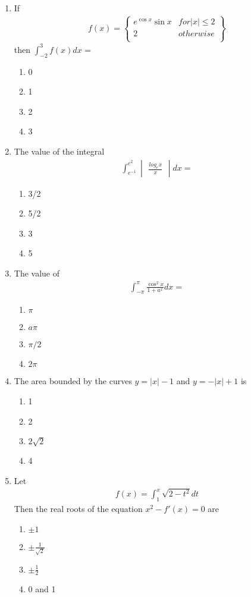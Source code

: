 \begin{enumerate}[label=\arabic*.,ref=\thesubsection.\theenumi]
\item If 
\begin{align*}
f(x) = 
\left\lbrace
\begin{array}{ll}
      e^{\cos x}\sin x & for |x| \leq 2 \\
      2 & otherwise \\
\end{array} 
\right\rbrace
\end{align*} 
then $\int_{-2}^{3}f(x)dx$ = 
\begin{enumerate}
\item 0
\item 1
\item 2
\item 3
\end{enumerate}

\item The value of the integral 
\begin{align*}
\int_{e^{-1}}^{e^{2}}\begin{vmatrix} \frac{log_ex}{x} \end{vmatrix}dx =
\end{align*}
\begin{enumerate}
\item 3/2
\item 5/2
\item 3
\item 5
\end{enumerate}

\item The value of 
\begin{align*}
\int_{-\pi}^{\pi}\frac{\cos^{2}x}{1 + a^{x}}dx = 
\end{align*}
\begin{enumerate}
\item $\pi$
\item $a\pi$
\item $\pi/2$
\item $2\pi$
\end{enumerate}

\item The area bounded by the curves $y = |x| - 1$ and $y = -|x| + 1$ is
\begin{enumerate}
\item 1
\item 2
\item $2\sqrt{2}$
\item 4
\end{enumerate}

\item Let
\begin{align*}
f(x) = \int_{1}^{x}\sqrt{2 - t^{2}}dt
\end{align*}
Then the real roots of the equation $x^2 - f'(x) = 0$ are
\begin{enumerate}
\item $\pm 1$
\item $\pm \frac{1}{\sqrt{2}}$
\item $\pm \frac{1}{2}$
\item 0 and 1
\end{enumerate}


\end{enumerate}
